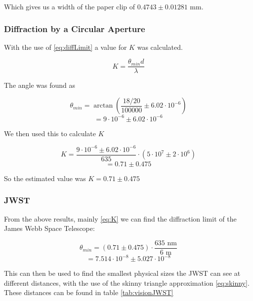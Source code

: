 \documentclass{emulateapj}
\begin{document}
Which gives us a width of the paper clip of $0.4743 \pm 0.01281 \text{ mm}$.

\subsubsection{Diffraction by a Circular Aperture}

With the use of \eqref{eq:diffLimit} a value for $K$ was calculated.

\begin{equation}
K = \frac{\theta_{min} d}{\lambda}
\end{equation}

The angle was found as

\begin{equation}
\theta_{min} = \arctan\left(\frac{18/20}{100000} \pm 6.02\cdot 10^{-6} \right)
\end{equation}
\begin{equation}
= 9\cdot 10^{-6} \pm 6.02\cdot 10^{-6}
\end{equation}

We then used this to calculate $K$

\begin{equation}
K = \frac{9\cdot 10^{-6} \pm 6.02\cdot 10^{-6}}{635}\cdot(5\cdot10^7 \pm 2\cdot10^6)
\end{equation}
\begin{equation}
= 0.71 \pm 0.475
\end{equation}\label{eq:K}

So the estimated value was $K = 0.71 \pm 0.475$


\subsubsection{JWST}
From the above results, mainly \eqref{eq:K} we can find the diffraction limit of the James Webb Space Telescope:

\begin{equation}
\theta_{min} = (0.71 \pm 0.475) \cdot \frac{635 \text{ nm}}{6 \text{ m}}
\end{equation}
\begin{equation}
= 7.514\cdot 10^{-8} \pm 5.027\cdot 10^{-8}
\end{equation}\label{JWSTDiffLimit}

This can then be used to find the smallest physical sizes the JWST can see at different distances, with the use of the skinny triangle approximation \eqref{eq:skinny}. These distances can be found in table \eqref{tab:visionJWST}
\end{document}
